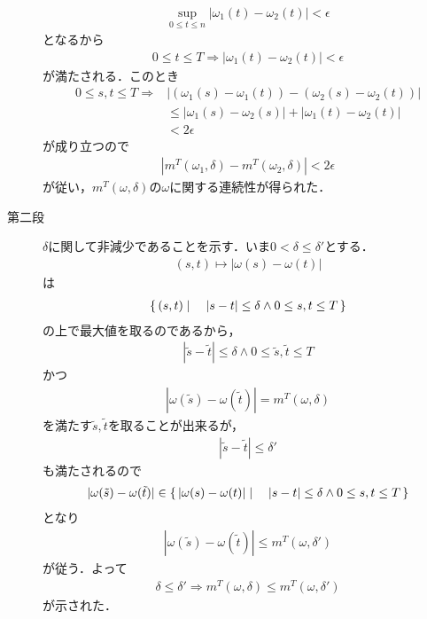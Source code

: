 \begin{sketch}
\begin{description}
				\begin{align}
					\operatorname*{sup}_{0 \leq t \leq n}|\omega_1(t) - \omega_2(t)|
					< \epsilon
				\end{align}
				となるから
				\begin{align}
					0 \leq t \leq T \Longrightarrow |\omega_1(t) - \omega_2(t)| < \epsilon
				\end{align}
				が満たされる．このとき
				\begin{align}
					0 \leq s,t \leq T \Longrightarrow 
					&|(\omega_1(s) - \omega_1(t)) - (\omega_2(s) - \omega_2(t))| \\
					&\leq |\omega_1(s) - \omega_2(s)| + |\omega_1(t) - \omega_2(t)| \\
					&< 2\epsilon
				\end{align}
				が成り立つので
				\begin{align}
					\left| m^T(\omega_1,\delta) - m^T(\omega_2,\delta) \right| < 2\epsilon
				\end{align}
				が従い，$m^T(\omega,\delta)$の$\omega$に関する連続性が得られた．
			
			\item[第二段]
				$\delta$に関して非減少であることを示す．いま$0 < \delta \leq \delta'$とする．
				\begin{align}
					(s,t) \longmapsto |\omega(s) - \omega(t)|
				\end{align}
				は
				\begin{align}
					\left\{\, (s,t) \mid \quad |s-t| \leq \delta \wedge 0 \leq s,t \leq T\, \right\}
				\end{align}
				の上で最大値を取るのであるから，
				\begin{align}
					|\tilde{s} - \tilde{t}| \leq \delta \wedge
					0 \leq \tilde{s}, \tilde{t} \leq T
				\end{align}
				かつ
				\begin{align}
					|\omega(\tilde{s}) - \omega(\tilde{t})| = m^T(\omega,\delta)
				\end{align}
				を満たす$\tilde{s},\tilde{t}$を取ることが出来るが，
				\begin{align}
					|\tilde{s} - \tilde{t}| \leq \delta'
				\end{align}
				も満たされるので
				\begin{align}
					|\omega(\tilde{s}) - \omega(\tilde{t})|
					\in \left\{\, |\omega(s) - \omega(t)| \mid \quad |s - t| \leq \delta \wedge 0 \leq s, t \leq T\, \right\}
				\end{align}
				となり
				\begin{align}
					|\omega(\tilde{s}) - \omega(\tilde{t})| \leq m^T(\omega,\delta')
				\end{align}
				が従う．よって
				\begin{align}
					\delta \leq \delta' \Longrightarrow m^T(\omega,\delta) \leq m^T(\omega,\delta')
				\end{align}
				が示された．
			

\end{description}
\end{sketch}
